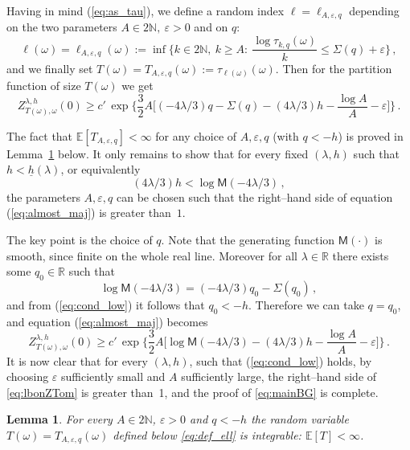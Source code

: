 \documentclass[reqno,11pt]{amsart}
\numberwithin{equation}{section}
\newtheorem{lemma}[theorem]{Lemma}
\newcommand{\R}{\mathbb{R}}
\newcommand{\N}{\mathbb{N}}
\newcommand{\bbE}{{\ensuremath{\mathbb E}} }
\newcommand{\gep}{\varepsilon}       %
\newcommand{\go}{\omega}
\newcommand{\gl}{\lambda}
\newcommand{\gS}{\Sigma}
\newcommand{\M}{\textsf{M}}
\begin{document}
Having in mind (\ref{eq:as_tau}), we define a random index $\ell=\ell_{A,\gep,q}$ depending on the two parameters $A \in 2\N,\ \gep>0$ and on $q$:
\begin{equation} \label{eq:def_ell}
\ell(\go)  = \ell_{A,\gep,q}(\go) := \inf \bigg\{ k\in 2 \N,\ k \ge A:\ \frac{\log \tau_{k,q}(\go)}{k} \le \gS(q) + \gep \bigg\} \,,
\end{equation}
and we finally set $T (\go) = T_{A,\gep,q} (\go) := \tau_{\ell(\go)}(\go)$. Then for the partition function of size $T(\go)$ we get
\begin{equation} \label{eq:almost_maj}
Z_{T(\go), \go}^{\gl,h}(0) \ge c'\, \exp \bigg\{ \frac 3 2 A \bigg[ (-4\gl /3)q - \gS(q) - (4\gl /3)h - \frac{\log A}{A} - \gep \bigg] \bigg\} \,.
\end{equation}

The fact that $\bbE[T_{A,\gep,q}]<\infty$ for any choice of $A,\gep,q$ (with $q<-h$) is proved in Lemma~\ref{lem:stopping2} below. It only remains to show that for every fixed $(\gl,h)$ such that $h<\underline h(\gl)$, or equivalently
\begin{equation}
\label{eq:cond_low}
(4\gl/3)h < \log \M(-4\gl/3)\,,
\end{equation}
the parameters $A,\gep,q$ can be chosen such that the right--hand side
 of equation (\ref{eq:almost_maj}) is greater than~$1$.

\smallskip

The key point is the choice of  $q$. Note that
the generating function $ \M(\cdot)$ is smooth, since  finite on the whole real line.
 Moreover for all $ \gl \in\R$ there exists some $q_0\in\R$ such that
\begin{equation}
\log \M(-4\gl/3) = (-4\gl/3) q_0 - \gS(q_0)\,,
\end{equation}
and from (\ref{eq:cond_low}) it follows that $q_0 < -h$. Therefore we can take $q=q_0$, and equation (\ref{eq:almost_maj}) becomes
\begin{equation}
\label{eq:lbonZTom}
Z_{T(\go), \go}^{\gl,h}(0) \ge c'\, \exp \bigg\{ \frac 3 2 A \bigg[ \log \M(-4\gl/3) - (4\gl/3) h - \frac{\log A}{A} - \gep \bigg] \bigg\} \,.
\end{equation}
It is now clear that for every $(\gl,h)$, such that (\ref{eq:cond_low}) holds, by choosing
$\gep$ sufficiently small and $A$ sufficiently large, the right--hand side of \eqref{eq:lbonZTom} is greater than~1, and the proof of \eqref{eq:mainBG} is complete.

\medskip

\begin{lemma}
\label{lem:stopping2}
For every $A\in 2\N$,  $\gep > 0$ and $ q <-h$
the random variable $T(\go)=T_{A,\gep,q}(\go)$ defined
below \eqref{eq:def_ell} is integrable: $\bbE[T]<\infty$.
\end{lemma}
\end{document}
